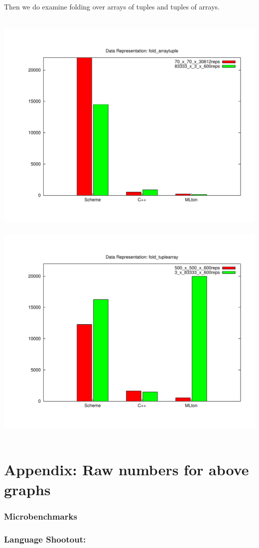 \documentclass{article}
\begin{document}
Then we do examine folding over arrays of tuples and tuples of arrays.
\begin{center}
\mbox{
\includegraphics[width=0.48\hsize]{datareps/fold_arraytuple.pdf}
\includegraphics[width=0.48\hsize]{datareps/fold_tuplearray.pdf}
}
\end{center}









\appendix
\section{Appendix: Raw numbers for above graphs}

\subsubsection*{Microbenchmarks}
{\footnotesize

}

\subsubsection*{Language Shootout:}
{\footnotesize
}
\end{document}
